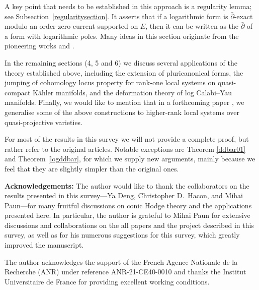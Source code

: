 \documentclass[english]{amsart}
\newcommand{\dbar}{\bar \partial}
\numberwithin{equation}{thm}
\begin{document}
	A key point that needs to be established in this approach is a regularity lemma; see Subsection~\ref{regularitysection}. It asserts that if a logarithmic form is \(\dbar\)-exact modulo an order-zero current supported on \(E\), then it can be written as the \(\dbar\) of a form with logarithmic poles. Many ideas in this section originate from the pioneering works \cite{Nog95} and \cite{LRW}.
	
	\medskip
	
	In the remaining sections (4, 5 and 6) we discuss several applications of the theory established above, including the extension of pluricanonical forms, the jumping of cohomology locus property for rank-one local systems on quasi-compact Kähler manifolds, and the deformation theory of log Calabi--Yau manifolds. Finally, we would like to mention that in a forthcoming paper \cite{CDHP2}, we generalise some of the above constructions to higher-rank local systems over quasi-projective varieties.
	
	For most of the results in this survey we will not provide a complete proof, but rather refer to the original articles. Notable exceptions are 
Theorem \ref{ddbar01} and Theorem \ref{logddbar}, for which we supply new arguments, mainly because we feel that they are slightly simpler than the original ones.
	\bigskip

\textbf{Acknowledgements:} The author would like to thank the collaborators on the results presented in this survey---Ya Deng, Christopher D.~Hacon, and Mihai Paun---for many fruitful discussions on conic Hodge theory and the applications presented here. In particular, the author is grateful to Mihai Paun for extensive discussions and collaborations on the all papers and the project described in this survey, as well as for his numerous suggestions for this survey, which greatly improved the manuscript.

The author acknowledges the support of the French Agence Nationale de la Recherche (ANR) under reference ANR-21-CE40-0010 and thanks the Institut Universitaire de France for providing excellent working conditions.

\tableofcontents
\end{document}
